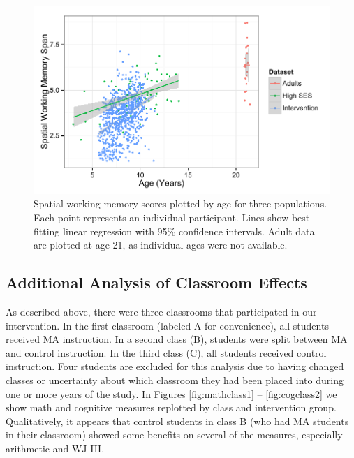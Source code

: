 \documentclass[11pt]{article}
\begin{document}
\begin{figure}[H]
\begin{center}
\includegraphics[width=4.5in]{figures/swm.pdf}
\end{center}
\caption{Spatial working memory scores plotted by age for three populations. Each point represents an individual participant. Lines show best fitting linear regression with 95\% confidence intervals. Adult data are plotted at age 21, as individual ages were not available.}
\label{fig:swm}
\end{figure}


\subsection{Additional Analysis of Classroom Effects}

As described above, there were three classrooms that participated in our intervention. In the first classroom (labeled A for convenience), all students received MA instruction. In a second class (B), students were split between MA and control instruction. In the third class (C), all students received control instruction. Four students are excluded for this analysis due to having changed classes or uncertainty about which classroom they had been placed into during one or more years of the study. In Figures \ref{fig:mathclass1} -- \ref{fig:cogclass2} we show math and cognitive measures replotted by class and intervention group. Qualitatively, it appears that control students in class B (who had MA students in their classroom) showed some benefits on several of the measures, especially arithmetic and WJ-III. 
\end{document}
